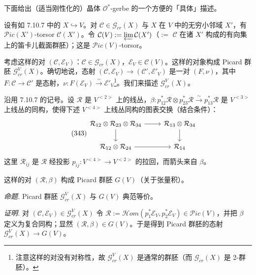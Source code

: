 
 下面给出（适当刚性化的）晶体 $\mathcal{O}^{*}$-gerbe 的一个方便的「具体」描述。

设有如 7.10.7 中的 $X\hookrightarrow V$。对 $\mathcal{C}\in\mathcal{G}_{cr}(X)$ 与 $X$ 在 $V$ 中的无穷小邻域 $X'$，有 $\mathcal{P}ic(X')$-torsor $\mathcal{C}(X')$。令 $\mathcal{C}(V):=\varprojlim\mathcal{C}(X')$（$:=$ $\mathcal{C}$ 在诸 $X'$ 构成的有向集上的笛卡儿截面群胚）；这是 $\mathcal{P}ic(V)$-torsor。

考虑这样的对 $(\mathcal{C},\mathcal{E}_{V})$：$\mathcal{C}\in\mathcal{G}_{cr}(X)$，$\mathcal{E}_{V}\in\mathcal{C}(V)$。这样的对象构成 Picard 群胚 $\mathcal{G}^{V}_{cr}(X)$。确切地说，态射 $(\mathcal{C},\mathcal{E}_{V})\to(\mathcal{C}',\mathcal{E}'_{V})$ 是一对 $(F,\nu)$，其中 $F:\mathcal{C}\to\mathcal{C}'$ 是态射，$\nu:F(\mathcal{E}_{V})\xrightarrow{\sim}\mathcal{E}'_{V}$\footnote{注意这样的对没有对称性，故 $\mathcal{G}^{V}_{cr}(X)$ 是通常的群胚（而 $\mathcal{G}_{cr}(X)$ 是 2-群胚）。}。我们来描述 $\mathcal{G}^{V}_{cr}(X)$。

沿用 7.10.7 的记号。设 $\mathcal{R}$ 是 $V^{<2>}$ 上的线丛，$\beta:p^{*}_{12}\mathcal{R}\otimes p^{*}_{23}\mathcal{R}\xrightarrow{\sim}p^{*}_{13}\mathcal{R}$ 是 $V^{<3>}$ 上线丛的同构，使得下述 $V^{<4>}$ 上线丛同构的图表交换（结合条件）：
\begin{equation}\tag{343}
\begin{tikzcd}
\mathcal{R}_{12}\otimes\mathcal{R}_{23}\otimes\mathcal{R}_{34} \arrow[r] \arrow[d] & \mathcal{R}_{13}\otimes\mathcal{R}_{34} \arrow[d]\\
\mathcal{R}_{12}\otimes\mathcal{R}_{24} \arrow[r] & \mathcal{R}_{14}
\end{tikzcd}
\end{equation}
这里 $\mathcal{R}_{ij}$ 是 $\mathcal{R}$ 经投影 $p_{ij}:V^{<4>}\to V^{<2>}$ 的拉回，而箭头来自 $\beta$。

这样的对 $(\mathcal{R},\beta)$ 构成 Picard 群胚 $G(V)$（关于张量积）。

 \emph{命题.} Picard 群胚 $\mathcal{G}^{V}_{cr}(X)$ 与 $G(V)$ 典范等价。

\emph{证明.} 对 $(\mathcal{C},\mathcal{E}_{V})\in\mathcal{G}^{V}_{cr}(X)$ 令 $\mathcal{R}:=\mathcal{H}om(p^{*}_{1}\mathcal{E}_{V},p^{*}_{2}\mathcal{E}_{V})\in\mathcal{P}ic(V)$，并把 $\beta$ 定义为复合同构；显然 $(\mathcal{R},\beta)\in G(V)$。于是得到 Picard 群胚的态射 $\mathcal{G}^{V}_{cr}(X)\to G(V)$。

